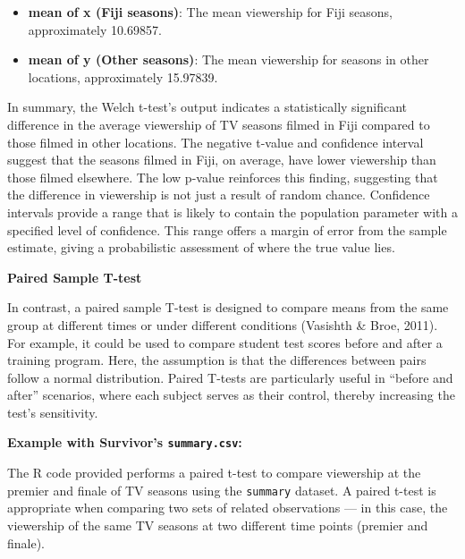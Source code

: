 \documentclass[
]{book}
\newenvironment{Shaded}{\begin{snugshade}}{\end{snugshade}}
\newcommand{\AttributeTok}[1]{\textcolor[rgb]{0.13,0.29,0.53}{#1}}
\newcommand{\CommentTok}[1]{\textcolor[rgb]{0.56,0.35,0.01}{\textit{#1}}}
\newcommand{\ConstantTok}[1]{\textcolor[rgb]{0.56,0.35,0.01}{#1}}
\newcommand{\FunctionTok}[1]{\textcolor[rgb]{0.13,0.29,0.53}{\textbf{#1}}}
\newcommand{\NormalTok}[1]{#1}
\newcommand{\OtherTok}[1]{\textcolor[rgb]{0.56,0.35,0.01}{#1}}
\newcommand{\SpecialCharTok}[1]{\textcolor[rgb]{0.81,0.36,0.00}{\textbf{#1}}}
\providecommand{\tightlist}{%
  \setlength{\itemsep}{0pt}\setlength{\parskip}{0pt}}
\begin{document}
\begin{enumerate}
  \begin{itemize}
  \tightlist
  \item
    \textbf{mean of x (Fiji seasons)}: The mean viewership for Fiji seasons, approximately 10.69857.
  \item
    \textbf{mean of y (Other seasons)}: The mean viewership for seasons in other locations, approximately 15.97839.
  \end{itemize}
\end{enumerate}

In summary, the Welch t-test's output indicates a statistically significant difference in the average viewership of TV seasons filmed in Fiji compared to those filmed in other locations. The negative t-value and confidence interval suggest that the seasons filmed in Fiji, on average, have lower viewership than those filmed elsewhere. The low p-value reinforces this finding, suggesting that the difference in viewership is not just a result of random chance. Confidence intervals provide a range that is likely to contain the population parameter with a specified level of confidence. This range offers a margin of error from the sample estimate, giving a probabilistic assessment of where the true value lies.

\textbf{Paired Sample T-test}

In contrast, a paired sample T-test is designed to compare means from the same group at different times or under different conditions (Vasishth \& Broe, 2011). For example, it could be used to compare student test scores before and after a training program. Here, the assumption is that the differences between pairs follow a normal distribution. Paired T-tests are particularly useful in ``before and after'' scenarios, where each subject serves as their control, thereby increasing the test's sensitivity.

\textbf{Example with Survivor's \texttt{summary.csv}:}

The R code provided performs a paired t-test to compare viewership at the premier and finale of TV seasons using the \texttt{summary} dataset. A paired t-test is appropriate when comparing two sets of related observations --- in this case, the viewership of the same TV seasons at two different time points (premier and finale).

\begin{Shaded}
\end{Shaded}
\end{document}
